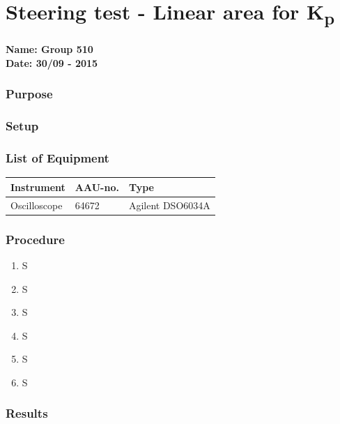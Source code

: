 \pagebreak
\section{Steering test - Linear area for \si{K_p}} \label{app:LinearAreaKp}
\textbf{Name: Group 510}\\
\textbf{Date: 30/09 - 2015}

\subsubsection{Purpose}


\subsubsection{Setup}


\subsubsection{List of Equipment}

\begin{table}[H]
\begin{tabular}{|l|l|p{4cm}|}
\hline%
  \textbf{Instrument}                        &  \textbf{AAU-no.}  &  \textbf{Type}       \\
\hline%
  Oscilloscope                               &  64672             &  Agilent DSO6034A    \\
\hline
\end{tabular}
\end{table}

\subsubsection{Procedure}

\begin{enumerate}
  \item S
  \item S
  \item S
  \item S
  \item S
  \item S
\end{enumerate}

\subsubsection{Results}

